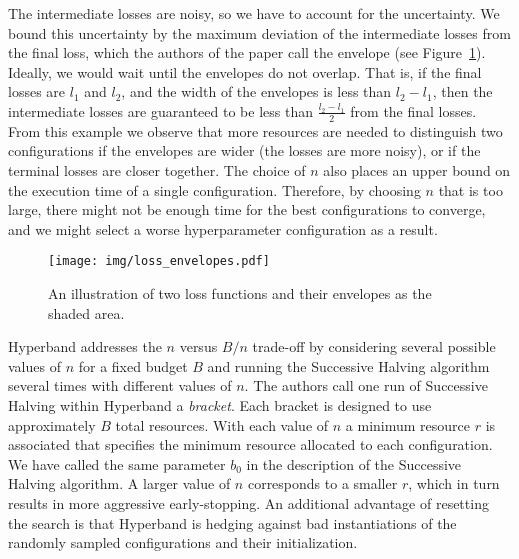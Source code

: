 The intermediate losses are noisy, so we have to account for the uncertainty. We bound this uncertainty by the maximum deviation of the intermediate losses from the final loss, which the authors of the paper call the envelope (see Figure~\ref{fig:envelopes}). Ideally, we would wait until the envelopes do not overlap. That is, if the final losses are $l_1$ and $l_2$, and the width of the envelopes is less than $l_2-l_1$, then the intermediate losses are guaranteed to be less than $\frac{l_2-l_1}{2}$ from the final losses. From this example we observe that more resources are needed to distinguish two configurations if the envelopes are wider (the losses are more noisy), or if the terminal losses are closer together. The choice of $n$ also places an upper bound on the execution time of a single configuration. Therefore, by choosing $n$ that is too large, there might not be enough time for the best configurations to converge, and we might select a worse hyperparameter configuration as a result.

\begin{figure}
    \centering
    \texttt{[image: img/loss\_envelopes.pdf]}
    \caption{An illustration of two loss functions and their envelopes as the shaded area.}
    \label{fig:envelopes}
\end{figure}


Hyperband addresses the $n$ versus $B/n$ trade-off by considering several possible values of $n$ for a fixed budget $B$ and running the Successive Halving algorithm several times with different values of $n$. The authors call one run of Successive Halving within Hyperband a \textit{bracket}. Each bracket is designed to use approximately $B$ total resources. With each value of $n$ a minimum resource $r$ is associated that specifies the minimum resource allocated to each configuration. We have called the same parameter $b_0$ in the description of the Successive Halving algorithm. A larger value of $n$ corresponds to a smaller $r$, which in turn results in more aggressive early-stopping. An additional advantage of resetting the search is that Hyperband is hedging against bad instantiations of the randomly sampled configurations and their initialization.

